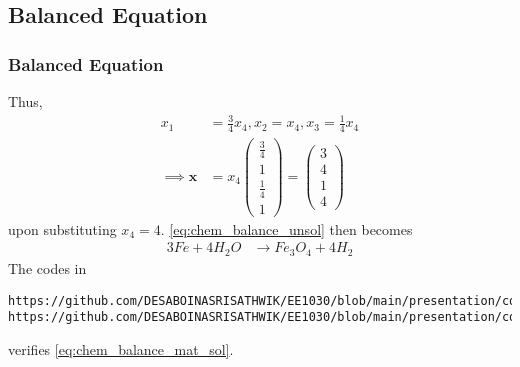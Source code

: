 \documentclass{beamer}
\theoremstyle{remark}
\newcommand{\myvec}[1]{\ensuremath{\begin{pmatrix}#1\end{pmatrix}}}
\let\vec\mathbf
\numberwithin{equation}{section}
\begin{document}
\subsection{Balanced Equation}
\begin{frame}[fragile]
\frametitle{Balanced Equation}

Thus, 
\begin{align}
\label{eq:chem_balance_mat_sol}
x_1 &= \frac{3}{4}x_4, x_2 = x_4, x_3 = \frac{1}{4}x_4
\\
\implies \vec{x} &= x_4\myvec{\frac{3}{4} \\ 1 \\ \frac{1}{4} \\ 1}= \myvec{3 \\ 4 \\ 1 \\ 4}
\end{align}
%
upon substituting $x_4 = 4$.
%
\eqref{eq:chem_balance_unsol} then becomes
%
\begin{align}
\label{eq:chem_balance_final}
3Fe+4H_2 O &\rightarrow Fe_3 O_4 + 4H_2
\end{align}
The codes in 
{\footnotesize
\begin{lstlisting}
https://github.com/DESABOINASRISATHWIK/EE1030/blob/main/presentation/codes/plot.py
https://github.com/DESABOINASRISATHWIK/EE1030/blob/main/presentation/codes/code.c
\end{lstlisting}
}
verifies \eqref{eq:chem_balance_mat_sol}.
%
\end{frame}
%
%  
%
%
\end{document}
